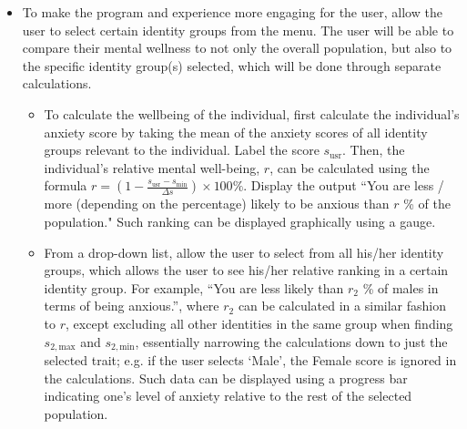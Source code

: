 \documentclass[fontsize=11pt]{article}
\begin{document}
\begin{itemize}
\begin{itemize}
            \item To make the program and experience more engaging for the user, allow the user to select certain identity groups from the menu. The user will be able to compare their mental wellness to not only the overall population, but also to the specific identity group(s) selected, which will be done through separate calculations.

            \begin{itemize}
                \item To calculate the wellbeing of the individual, first calculate the individual’s anxiety score by taking the mean of the anxiety scores of all identity groups relevant to the individual. Label the score $s_{\mathrm{usr}}$. Then, the individual’s relative mental well-being, $r$, can be calculated using the formula $r = \left(1 - \frac{s_{\mathrm{usr}} - s_{\mathrm{min}}}{\Delta s}\right) \times 100 \%$. Display the output ``You are less / more (depending on the percentage) likely to be anxious than $r$ \% of the population." Such ranking can be displayed graphically using a gauge.

                \item From a drop-down list, allow the user to select from all his/her identity groups, which allows the user to see his/her relative ranking in a certain identity group. For example, ``You are less likely than $r_2$ \% of males in terms of being anxious.”, where $r_2$ can be calculated in a similar fashion to $r$, except excluding all other identities in the same group when finding $s_{2,\mathrm{max}}$ and $s_{2,\mathrm{min}}$, essentially narrowing the calculations down to just the selected trait; e.g. if the user selects `Male’, the Female score is ignored in the calculations. Such data can be displayed using a progress bar indicating one’s level of anxiety relative to the rest of the selected population.
            \end{itemize}
        \end{itemize}
    \end{itemize}
\end{document}
